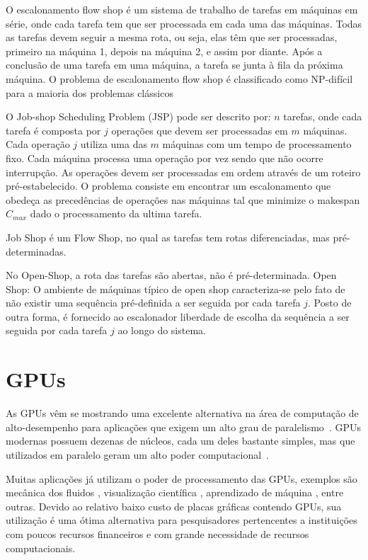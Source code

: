 O escalonamento flow shop é um sistema de trabalho de tarefas em máquinas em série, onde cada tarefa tem que ser processada em cada uma das máquinas. Todas as tarefas devem seguir a mesma rota, ou seja, elas têm que ser processadas, primeiro na máquina 1, depois na máquina 2, e assim por diante. Após a conclusão de uma tarefa em uma máquina, a tarefa se junta à fila da próxima máquina. O problema de escalonamento flow shop é classificado como NP-difícil para a maioria dos problemas clássicos

O Job-shop Scheduling Problem (JSP) pode ser descrito por: $n$ tarefas, onde cada tarefa é composta por $j$ operações que devem ser processadas em $m$ máquinas. Cada operação $j$ utiliza uma das $m$ máquinas com um tempo de processamento fixo. Cada máquina processa uma operação por vez sendo que não ocorre interrupção. As operações devem ser processadas em ordem através de um roteiro pré-estabelecido. O problema consiste em encontrar um escalonamento que obedeça as precedências de operações nas máquinas tal que minimize o makespan $C_{max}$ dado o processamento da ultima tarefa. 

Job Shop é um Flow Shop, no qual as tarefas tem rotas diferenciadas, mas pré-determinadas.

No Open-Shop, a rota das tarefas são abertas, não é pré-determinada. Open Shop: O ambiente de máquinas típico de open shop caracteriza-se pelo fato de não existir uma sequência pré-definida a ser seguida por cada tarefa $j$. Posto de outra forma, é fornecido ao escalonador liberdade de escolha da sequência a ser seguida por cada tarefa $j$ ao longo do sistema.


\section{GPUs}\label{intro:historico}

As GPUs vêm se mostrando uma excelente alternativa na área de computação de alto-desempenho para aplicações que exigem um alto grau de paralelismo~\cite{gpu}. GPUs modernas possuem dezenas de núcleos, cada um deles bastante simples, mas que utilizados em paralelo geram um alto poder computacional~\cite{cuda}.

Muitas aplicações já utilizam o poder de processamento das GPUs, exemplos são mecânica dos fluidos \cite{fluido}, visualização científica \cite{visualizacao},  aprendizado de máquina \cite{Aprendizado}, entre outras. Devido ao relativo baixo custo de placas gráficas contendo GPUs, sua utilização é uma ótima alternativa para pesquisadores pertencentes a instituições com poucos recursos financeiros e com grande necessidade de recursos computacionais.


